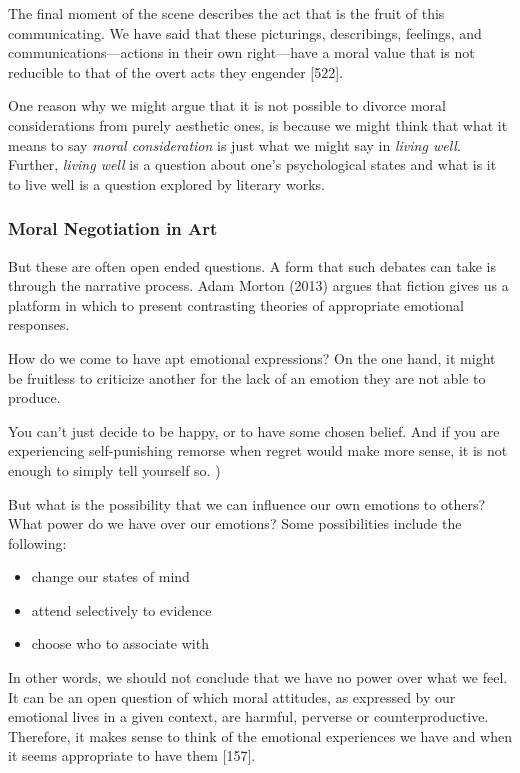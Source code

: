 \documentclass[
  letterpaper,
  DIV=11,
  numbers=noendperiod]{scrartcl}
\theoremstyle{remark}
\begin{document}
The final moment of the scene describes the act that is the fruit of
this communicating. We have said that these picturings, describings,
feelings, and communications---actions in their own right---have a moral
value that is not reducible to that of the overt acts they engender
{[}522{]}.

One reason why we might argue that it is not possible to divorce moral
considerations from purely aesthetic ones, is because we might think
that what it means to say \emph{moral consideration} is just what we
might say in \emph{living well}. Further, \emph{living well} is a
question about one's psychological states and what is it to live well is
a question explored by literary works.

\subsubsection{Moral Negotiation in Art}\label{moral-negotiation-in-art}

But these are often open ended questions. A form that such debates can
take is through the narrative process. Adam Morton (2013) argues that
fiction gives us a platform in which to present contrasting theories of
appropriate emotional responses.

How do we come to have apt emotional expressions? On the one hand, it
might be fruitless to criticize another for the lack of an emotion they
are not able to produce.

You can't just decide to be happy, or to have some chosen belief. And if
you are experiencing self-punishing remorse when regret would make more
sense, it is not enough to simply tell yourself so. )

But what is the possibility that we can influence our own emotions to
others? What power do we have over our emotions? Some possibilities
include the following:

\begin{itemize}
\item
  change our states of mind
\item
  attend selectively to evidence
\item
  choose who to associate with
\end{itemize}

In other words, we should not conclude that we have no power over what
we feel. It can be an open question of which moral attitudes, as
expressed by our emotional lives in a given context, are harmful,
perverse or counterproductive. Therefore, it makes sense to think of the
emotional experiences we have and when it seems appropriate to have them
{[}157{]}.
\end{document}
